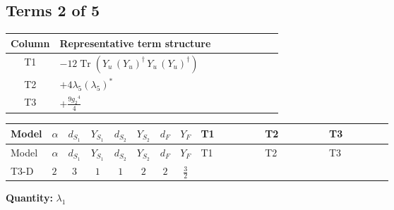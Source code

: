 \documentclass[8pt]{article}
\begin{document}
\begin{landscape}
\subsection*{Terms 2 of 5}
\begin{center}
\begin{tabular}{@{}c >{\raggedright\arraybackslash}p{0.82\linewidth}@{}}
\toprule
Column & Representative term structure \\
\midrule
T1 & \(\displaystyle -12 \operatorname{Tr}\!\left({Y_u}\,\left({Y_u}\right)^{\dagger}\,{Y_u}\,\left({Y_u}\right)^{\dagger}\right)\) \\
\midrule
T2 & \(\displaystyle +4 {\lambda_5} \left({\lambda_5}\right)^{*}\) \\
\midrule
T3 & \(\displaystyle +\frac{9 {g_2}^4}{4}\) \\
\midrule
\bottomrule
\end{tabular}
\end{center}
\smallskip
\tiny
\begin{longtable}{@{}llcccccc >{\raggedright\arraybackslash}p{0.21\linewidth} >{\raggedright\arraybackslash}p{0.21\linewidth} >{\raggedright\arraybackslash}p{0.21\linewidth}@{}}
\toprule
Model & $\alpha$ & $d_{S_1}$ & $Y_{S_1}$ & $d_{S_2}$ & $Y_{S_2}$ & $d_F$ & $Y_F$ & T1 & T2 & T3 \\
\midrule
\endfirsthead
\toprule
Model & $\alpha$ & $d_{S_1}$ & $Y_{S_1}$ & $d_{S_2}$ & $Y_{S_2}$ & $d_F$ & $Y_F$ & T1 & T2 & T3 \\
\midrule
\endhead
T3-D & $2$ & $3$ & $1$ & $1$ & $2$ & $2$ & $\frac{3}{2}$ & \scriptsize\adjustbox{max width=\linewidth}{$\begin{gathered} -12 \operatorname{Tr}\!\left({Y_u}\,\left({Y_u}\right)^{\dagger}\,{Y_u}\,\left({Y_u}\right)^{\dagger}\right)\end{gathered}$} & \scriptsize\adjustbox{max width=\linewidth}{$\begin{gathered} +4 {\lambda_5} \left({\lambda_5}\right)^{*}\end{gathered}$} & \scriptsize\adjustbox{max width=\linewidth}{$\begin{gathered} +\frac{9 {g_2}^4}{4}\end{gathered}$} \\
\midrule
\bottomrule
\end{longtable}
\clearpage
\noindent\textbf{Quantity: }$\lambda_1$\par\smallskip

\end{landscape}
\end{document}
